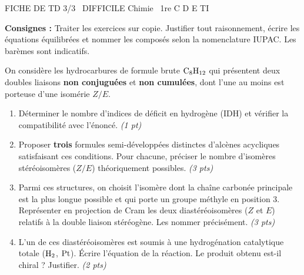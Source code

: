 \documentclass[11pt]{article}
\begin{document}
\pagestyle{empty}

\begin{tcolorbox}[enhanced,colback=popink,colframe=popink,arc=10pt,boxrule=0pt,left=12pt,right=12pt,top=9pt,bottom=9pt]
{\color{white}\popxbold\small FICHE DE TD 3/3 \textbullet\ DIFFICILE \hfill Chimie \textbullet\ 1re C D E TI\par}
\end{tcolorbox}
\vspace{4pt}

\noindent\textbf{Consignes :} Traiter les exercices sur copie. Justifier tout raisonnement, écrire les équations équilibrées et nommer les composés selon la nomenclature IUPAC. Les barèmes sont indicatifs.

\begin{exercice}
On considère les hydrocarbures de formule brute $\ce{C8H12}$ qui présentent deux doubles liaisons \textbf{non conjuguées} et \textbf{non cumulées}, dont l'une au moins est porteuse d'une isomérie $Z/E$.
\begin{enumerate}[label=\arabic*., ref=\arabic*, leftmargin=*, itemsep=6pt]
    \item Déterminer le nombre d'indices de déficit en hydrogène (IDH) et vérifier la compatibilité avec l'énoncé. \textit{(1 pt)}
    \item Proposer \textbf{trois} formules semi-développées distinctes d'alcènes acycliques satisfaisant ces conditions. Pour chacune, préciser le nombre d'isomères stéréoisomères ($Z/E$) théoriquement possibles. \textit{(3 pts)}
    \item Parmi ces structures, on choisit l'isomère dont la chaîne carbonée principale est la plus longue possible et qui porte un groupe méthyle en position 3. Représenter en projection de Cram les deux diastéréoisomères ($Z$ et $E$) relatifs à la double liaison stéréogène. Les nommer précisément. \textit{(3 pts)}
    \item L'un de ces diastéréoisomères est soumis à une hydrogénation catalytique totale ($\ce{H2}$, $\ce{Pt}$). Écrire l'équation de la réaction. Le produit obtenu est-il chiral ? Justifier. \textit{(2 pts)}
\end{enumerate}
\end{exercice}
\end{document}
